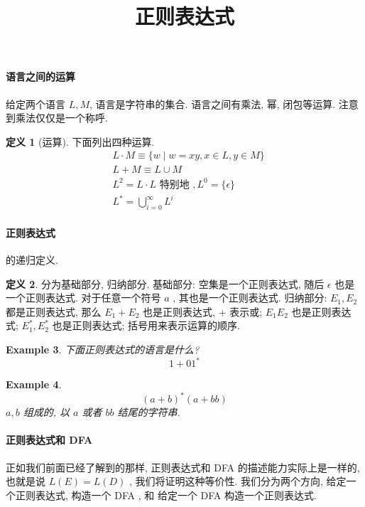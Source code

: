\documentclass[12pt]{ctexart}
\theoremstyle{definition}
\theoremstyle{definition}
\newtheorem{definition}{定义}[section]
\theoremstyle{plain}
\newtheorem{exam}[definition]{Example}
\begin{document}
\title{正则表达式}

\section{}
\paragraph{语言之间的运算}
给定两个语言 \(L, M\), 语言是字符串的集合. 语言之间有乘法, 幂, 闭包等运算. 注意到乘法仅仅是一个称呼. 
\begin{definition}[运算] 下面列出四种运算. \\ 
\[
\begin{aligned}
& L \cdot M \equiv \{ w \mid w = xy , x \in L , y \in M\} \\
& L + M \equiv L \cup M \\
& L^{2} = L \cdot L \text{ 特别地 }, L ^{0} = \{\epsilon\}\\
& L ^{*} = \bigcup_{i= 0 } ^{\infty} L ^{i}
\end{aligned}
\]
\end{definition}



\paragraph{正则表达式} 的递归定义. 
\begin{definition}
分为基础部分, 归纳部分. 基础部分: 空集是一个正则表达式, 随后 \(\epsilon\) 也是一个正则表达式. 
对于任意一个符号 \(a\) , 其也是一个正则表达式. 归纳部分: \(E_{1}, E_{2}\) 都是正则表达式, 那么 \(E_{1} + E_{2}\) 也是正则表达式,  \(+\) 表示或; \(E_{1} E_{2} \) 也是正则表达式; \(E_{1} ^{*}, E_{2} ^{*}\) 也是正则表达式; 括号用来表示运算的顺序. 
\end{definition}


\begin{exam}
下面正则表达式的语言是什么? 
\begin{equation}
1 + 0 1 ^{* } 
\end{equation}
\end{exam}
\begin{exam}
\begin{equation}
(a+ b ) ^{*} (a + bb ) 
\end{equation}
\(a , b\) 组成的, 以 \(a\) 或者 \(bb\) 结尾的字符串. 
\end{exam}

\paragraph{正则表达式和 DFA} 正如我们前面已经了解到的那样, 正则表达式和 DFA 的描述能力实际上是一样的, 也就是说 \(L (E ) = L ( D) \) , 我们将证明这种等价性. 我们分为两个方向, 给定一个正则表达式, 构造一个 DFA , 和 给定一个 DFA 构造一个正则表达式. 
\end{document}
